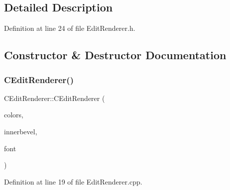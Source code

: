 \subsection{Detailed Description}


Definition at line 24 of file Edit\+Renderer.\+h.



\subsection{Constructor \& Destructor Documentation}
\hypertarget{classCEditRenderer_a672139544dacbe5fb75dd30663a0bc0b}{}\label{classCEditRenderer_a672139544dacbe5fb75dd30663a0bc0b} 
\subsubsection{\texorpdfstring{C\+Edit\+Renderer()}{CEditRenderer()}}
{\footnotesize\ttfamily C\+Edit\+Renderer\+::\+C\+Edit\+Renderer (\begin{DoxyParamCaption}\item[{std\+::shared\+\_\+ptr$<$ \hyperlink{classCGraphicTileset}{C\+Graphic\+Tileset} $>$}]{colors,  }\item[{std\+::shared\+\_\+ptr$<$ \hyperlink{classCBevel}{C\+Bevel} $>$}]{innerbevel,  }\item[{std\+::shared\+\_\+ptr$<$ \hyperlink{classCFontTileset}{C\+Font\+Tileset} $>$}]{font }\end{DoxyParamCaption})}



Definition at line 19 of file Edit\+Renderer.\+cpp.


